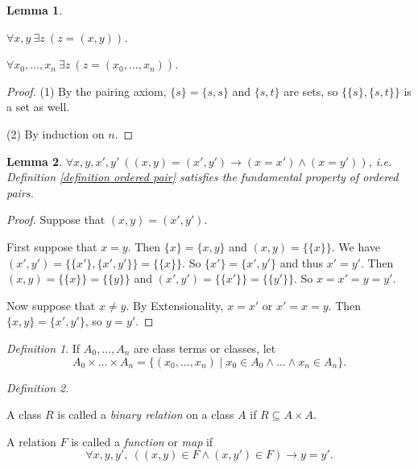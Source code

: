 \documentclass[a4paper, 11pt]{amsart}
\newtheorem{lemma}[lemma]{Lemma}
\theoremstyle{remark}
\newtheorem{definition}[definition]{Definition}
\newcommand{\axiomft}[1]{\mathsf{#1}}
\newcommand{\PA}{\axiomft{PA}}
\newenvironment{enumerate-(1)}{\begin{enumerate}[label={\upshape (\arabic*)}, leftmargin=2pc]}{\end{enumerate}}
\begin{document}

\begin{lemma} \ 
\begin{enumerate-(1)} 
\item 
$\forall x,y\ \exists z\ (z=(x,y))$. 
\item 
$\forall x_0,\dots, x_n\ \exists z\ (z=(x_0,\dots,x_n))$. 
\end{enumerate-(1)} 
\end{lemma} 
\begin{proof}
(1) 
By the pairing axiom, $\{s\}=\{s,s\}$ and $\{s,t\}$ are sets, so $\{\{s\},\{s,t\}\}$ is a set as well. 

(2) 
By induction on $n$.
\end{proof} 

\begin{lemma} 
$\forall x,y,x',y'\ ((x,y)=(x',y')\rightarrow (x=x')\wedge (x=y'))$, i.e. Definition \ref{definition ordered pair} satisfies the fundamental property of ordered pairs. 
\end{lemma} 
\begin{proof}
Suppose that $(x,y)=(x',y')$. 

First suppose that $x=y$. 
Then $\{x\}=\{x,y\}$ and $(x,y)=\{\{x\}\}$. 
We have $(x',y')=\{\{x'\},\{x',y'\}\}=\{\{x\}\}$. 
So $\{x'\}=\{x',y'\}$ and thus $x'=y'$. 
Then $(x,y)=\{\{x\}\}=\{\{y\}\}$ and $(x',y')=\{\{x'\}\}=\{\{y'\}\}$. 
So $x=x'=y=y'$. 

Now suppose that $x\neq y$. 
By Extensionality, $x=x'$ or $x'=x=y$. 
Then $\{x,y\}=\{x',y'\}$, so $y=y'$. 
\end{proof} 


\begin{definition} 
If $A_0,\dots, A_n$ are class terms or classes, let 
$$ A_0\times \dots \times A_n =\{ (x_0,\dots,x_n)\mid x_0\in A_0 \wedge \dots \wedge x_n \in A_n \} .$$ 
\end{definition} 


\begin{definition} \ 
\begin{enumerate-(1)}
\item 
A class $R$ is called a \emph{binary relation} on a class $A$ if $R\subseteq A\times A$. 
\item 
A relation $F$ is called a \emph{function} or \emph{map} if 
$$ \forall x,y,y',\ ((x,y)\in F \wedge (x,y')\in F )\rightarrow y=y' .$$ 
\end{enumerate-(1)}
\end{definition} 
\end{document}

